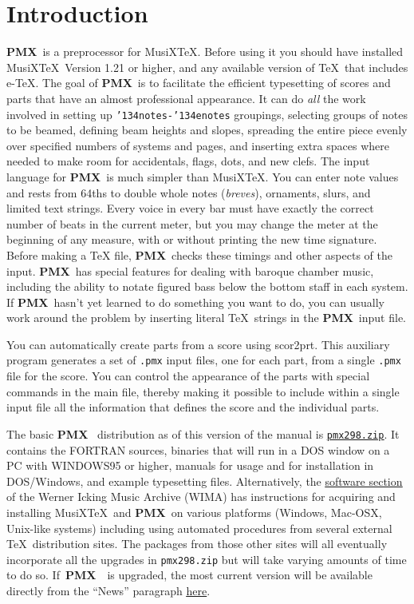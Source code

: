 \documentclass[11pt]{article}
\def\MusiXTeX{MusiX\TeX}
\def\bs{{\tt\char'134}}
\newcommand\PMXX{\textbf{PMX}}
\newcommand\PMX{\PMXX~}
\def\newfrom{2.59}  %
\def\NEW#1{\ifdim#1 pt<\newfrom pt\else%
\marginpar{\fbox{#1}}\fi}
\begin{document}
\section{Introduction}

        \PMX is a preprocessor for \MusiXTeX{}.  Before using it you should 
have installed \MusiXTeX~Version 1.21 \NEW{2.71} or higher, and 
any available version of \TeX~that includes e-\TeX.  The goal of \PMX is to 
facilitate the efficient typesetting of scores and parts
that have an almost professional appearance.  It can do {\it all} the work
involved in setting up {\tt \bs notes-\bs enotes} groupings, 
selecting groups of
notes to be beamed, defining beam heights and slopes, spreading the
entire piece evenly over specified numbers of systems and pages, and inserting
extra spaces where needed to make room for accidentals, flags, dots,
and new clefs. The input language for \PMX is much simpler than
\MusiXTeX.  You can enter note values and rests from 64ths to double 
whole notes ({\it breves}), ornaments, slurs, and limited text strings.  Every
voice in every bar must have exactly the correct number of beats in
the current meter, but you may change the meter at the beginning of any
measure, with or without printing the new time signature.  Before making a 
\TeX{} file, \PMX checks these timings and other aspects of the input.
\PMX has special features for dealing with baroque chamber music, including
the ability
to notate figured bass below the bottom staff in each system.  If \PMX hasn't
yet learned to do something you want to do, you can usually work around the 
problem by inserting literal \TeX\ strings in the \PMX input file.

     You can automatically create parts from a score using {\bfx scor2prt}.  
This auxiliary program generates a set of {\tt .pmx} input files, one for 
each part, from a single {\tt .pmx} file for the score.  
You can control the appearance of the 
parts with special commands in the main file, thereby making it  
possible to include within a single input file all the information 
that defines the score and the individual parts.

The basic \PMX
distribution as of this version of the manual is 
\href{http://icking-music-archive.org/software/pmx/pmx298.zip}
{\underline{\tt pmx298.zip}}.\NEW{2.98} It 
contains the FORTRAN sources, binaries that will run in a DOS
window on a PC with WINDOWS95 or higher, manuals for usage and for installation 
in DOS/Windows, and example typesetting files. Alternatively, the 
\href{http://www.icking-music-archive.org/software/htdocs/Getting_Started_Four_Scenar.html}
{\underline{software section}} of the Werner Icking Music Archive (WIMA) has instructions
for acquiring and installing \MusiXTeX~and \PMX on various platforms
(Windows, Mac-OSX, Unix-like systems) including using automated procedures from
several external \TeX~distribution sites.
The packages from those other sites will 
all eventually incorporate all the upgrades in {\tt pmx298.zip} but will take 
varying amounts of time to do so. If~\PMX~is upgraded, the most current version will
be available directly from the ``News'' paragraph
\href{http://www.icking-music-archive.org/software/htdocs/htdocs.html}{\underline{here}}. 
\end{document}
